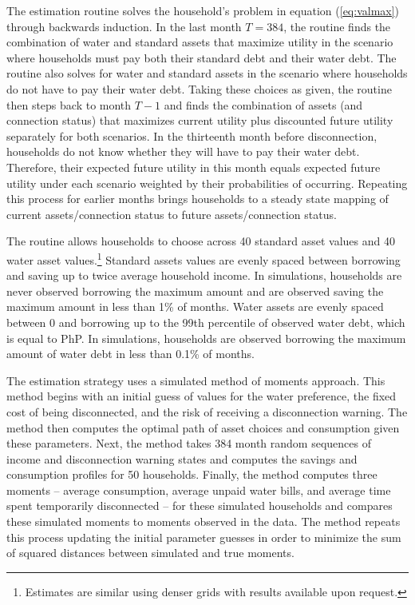 \documentclass[12pt]{article}
\begin{document}
The estimation routine solves the household's problem in equation (\ref{eq:valmax}) through backwards induction.  In the last month $T=384$, the routine finds the combination of water and standard assets that maximize utility in the scenario where households must pay both their standard debt and their water debt.  The routine also solves for water and standard assets in the scenario where households do not have to pay their water debt.  Taking these choices as given, the routine then steps back to month $T-1$ and finds the combination of assets (and connection status) that maximizes current utility plus discounted future utility separately for both scenarios.  In the thirteenth month before disconnection, households do not know whether they will have to pay their water debt.  Therefore, their expected future utility in this month equals expected future utility under each scenario weighted by their probabilities of occurring.  Repeating this process for earlier months brings households to a steady state mapping of current assets/connection status to future assets/connection status. 

The routine allows households to choose across 40 standard asset values and 40 water asset values.\footnote{Estimates are similar using denser grids with results available upon request.}  Standard assets values are evenly spaced between borrowing and saving up to twice average household income.  In simulations, households are never observed borrowing the maximum amount and are observed saving the maximum amount in less than 1\% of months.  Water assets are evenly spaced between 0 and borrowing up to the 99th percentile of observed water debt, which is equal to PhP.  In simulations, households are observed borrowing the maximum amount of water debt in less than 0.1\% of months.

The estimation strategy uses a simulated method of moments approach.  This method begins with an initial guess of values for the water preference, the fixed cost of being disconnected, and the risk of receiving a disconnection warning.  The method then computes the optimal path of asset choices and consumption given these parameters.  Next, the method takes 384 month random sequences of income and disconnection warning states and computes the savings and consumption profiles for 50 households.  Finally, the method computes three moments -- average consumption, average unpaid water bills, and average time spent temporarily disconnected -- for these simulated households and compares these simulated moments to moments observed in the data.  The method repeats this process updating the initial parameter guesses in order to  minimize the sum of squared distances between simulated and true moments.
\end{document}
